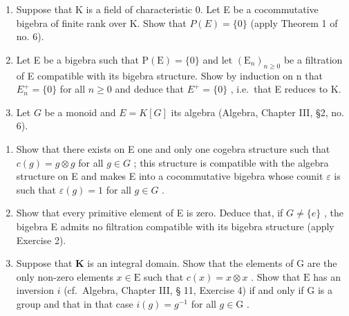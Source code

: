 
\begin{enumerate}
\def\labelenumi{\arabic{enumi}.}
\item
  Suppose that K is a field of characteristic 0. Let E be a cocommutative bigebra of finite rank over K. Show that \(P(E) = \{0\}\) (apply Theorem 1 of no. 6).
\item
  Let E be a bigebra such that \(\mathrm{P}(\mathrm{E})=\{0\}\) and let \((\mathrm{E}_{n})_{n\geqslant0}\) be a filtration of E compatible with its bigebra structure. Show by induction on n that \(E_{n}^{+}=\{0\}\) for all \(n\geqslant0\) and deduce that \(E^{+}=\{0\}\) , i.e.~that E reduces to K.
\item
  Let \(G\) be a monoid and \(E = K[G]\) its algebra (Algebra, Chapter III, §2, no. 6).
\end{enumerate}

\begin{enumerate}
\def\labelenumi{(\alph{enumi})}
\item
  Show that there exists on E one and only one cogebra structure such that \(c(g) = g \otimes g\) for all \(g \in G\) ; this structure is compatible with the algebra structure on E and makes E into a cocommutative bigebra whose counit \(\varepsilon\) is such that \(\varepsilon(g) = 1\) for all \(g \in G\) .
\item
  Show that every primitive element of E is zero. Deduce that, if \(G \neq \{e\}\) , the bigebra E admits no filtration compatible with its bigebra structure (apply Exercise 2).
\item
  Suppose that \(\mathbf{K}\) is an integral domain. Show that the elements of \(\mathrm{G}\) are the only non-zero elements \(x\in \mathrm{E}\) such that \(c(x) = x\otimes x\) . Show that \(\mathrm{E}\) has an inversion \(i\) (cf.~Algebra, Chapter III, § 11, Exercise 4) if and only if \(\mathrm{G}\) is a group and that in that case \(i(g) = g^{-1}\) for all \(g\in \mathrm{G}\) .
\end{enumerate}

